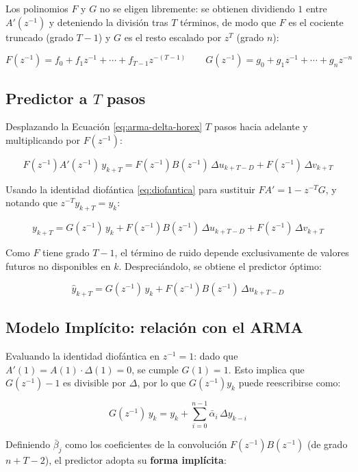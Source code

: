 Los polinomios $F$ y $G$ no se eligen libremente: se obtienen dividiendo $1$ entre $A'(z^{-1})$ y deteniendo la división tras $T$ términos, de modo que $F$ es el cociente truncado (grado $T-1$) y $G$ es el resto escalado por $z^T$ (grado $n$):

\[
  F(z^{-1}) = f_0 + f_1z^{-1} + \cdots + f_{T-1}z^{-(T-1)}
  \qquad
  G(z^{-1}) = g_0 + g_1z^{-1} + \cdots + g_nz^{-n}
\]

\subsection{Predictor a $T$ pasos}

Desplazando la Ecuación \ref{eq:arma-delta-horex} $T$ pasos hacia adelante y multiplicando por $F(z^{-1})$:

\[
  F(z^{-1})A'(z^{-1})\,y_{k+T} = F(z^{-1})B(z^{-1})\,\Delta u_{k+T-D} + F(z^{-1})\,\Delta v_{k+T}
\]

Usando la identidad diofántica \eqref{eq:diofantica} para sustituir $F A' = 1 - z^{-T}G$, y notando que $z^{-T}y_{k+T} = y_k$:

\[
  y_{k+T} = G(z^{-1})\,y_k + F(z^{-1})B(z^{-1})\,\Delta u_{k+T-D} + F(z^{-1})\,\Delta v_{k+T}
\]

Como $F$ tiene grado $T-1$, el término de ruido depende exclusivamente de valores futuros no disponibles en $k$. Despreciándolo, se obtiene el predictor óptimo:

\begin{equation}
  \hat{y}_{k+T} = G(z^{-1})\,y_k + F(z^{-1})B(z^{-1})\,\Delta u_{k+T-D}
  \label{eq:predictor-horex}
\end{equation}

\subsection{Modelo Implícito: relación con el ARMA}

Evaluando la identidad diofántica en $z^{-1}=1$: dado que $A'(1) = A(1)\cdot\Delta(1) = 0$, se cumple $G(1) = 1$. Esto implica que $G(z^{-1}) - 1$ es divisible por $\Delta$, por lo que $G(z^{-1})y_k$ puede reescribirse como:

\begin{equation}
  G(z^{-1})\,y_k = y_k + \sum_{i=0}^{n-1}\bar{\alpha}_i\,\Delta y_{k-i}
  \label{eq:G-reesc}
\end{equation}

Definiendo $\bar{\beta}_j$ como los coeficientes de la convolución $F(z^{-1})B(z^{-1})$ (de grado $n+T-2$), el predictor adopta su \textbf{forma implícita}:

